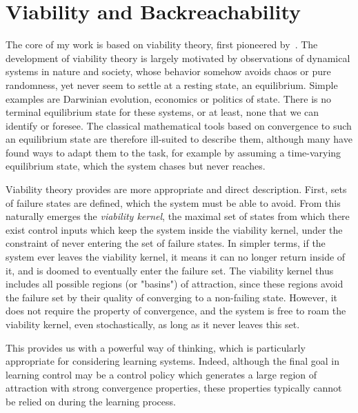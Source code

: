 \section{Viability and Backreachability}

The core of my work is based on viability theory, first pioneered by~\textcite{aubin2011viability}. The development of viability theory is largely motivated by observations of dynamical systems in nature and society, whose behavior somehow avoids chaos or pure randomness, yet never seem to settle at a resting state, an equilibrium.
Simple examples are Darwinian evolution, economics or politics of state. There is no terminal equilibrium state for these systems, or at least, none that we can identify or foresee.
The classical mathematical tools based on convergence to such an equilibrium state are therefore ill-suited to describe them, although many have found ways to adapt them to the task, for example by assuming a time-varying equilibrium state, which the system chases but never reaches. \par
Viability theory provides are more appropriate and direct description. First, sets of failure states are defined, which the system must be able to avoid. From this naturally emerges the \emph{viability kernel}, the maximal set of states from which there exist control inputs which keep the system inside the viability kernel, under the constraint of never entering the set of failure states. In simpler terms, if the system ever leaves the viability kernel, it means it can no longer return inside of it, and is doomed to eventually enter the failure set.
The viability kernel thus includes all possible regions (or "basins") of attraction, since these regions avoid the failure set by their quality of converging to a non-failing state. However, it does not require the property of convergence, and the system is free to roam the viability kernel, even stochastically, as long as it never leaves this set. \par
This provides us with a powerful way of thinking, which is particularly appropriate for considering learning systems. Indeed, although the final goal in learning control may be a control policy which generates a large region of attraction with strong convergence properties, these properties typically cannot be relied on during the learning process. \par
